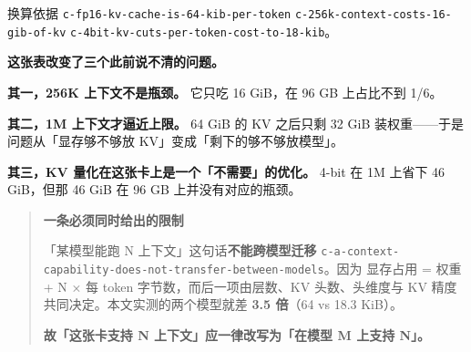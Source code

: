 换算依据 {\scriptsize\texttt{c-\hspace{0pt}fp16-\hspace{0pt}kv-\hspace{0pt}cache-\hspace{0pt}is-\hspace{0pt}64-\hspace{0pt}kib-\hspace{0pt}per-\hspace{0pt}token}} {\scriptsize\texttt{c-\hspace{0pt}256k-\hspace{0pt}context-\hspace{0pt}costs-\hspace{0pt}16-\hspace{0pt}gib-\hspace{0pt}of-\hspace{0pt}kv}} {\scriptsize\texttt{c-\hspace{0pt}4bit-\hspace{0pt}kv-\hspace{0pt}cuts-\hspace{0pt}per-\hspace{0pt}token-\hspace{0pt}cost-\hspace{0pt}to-\hspace{0pt}18-\hspace{0pt}kib}}。


\textbf{这张表改变了三个此前说不清的问题。}


\textbf{其一，256K 上下文不是瓶颈。} 它只吃 16 GiB，在 96 GB 上占比不到 1/6。


\textbf{其二，1M 上下文才逼近上限。} 64 GiB 的 KV 之后只剩 32 GiB 装权重——于是问题从「显存够不够放 KV」变成「剩下的够不够放模型」。


\textbf{其三，KV 量化在这张卡上是一个「不需要」的优化。} 4-bit 在 1M 上省下 46 GiB，但那 46 GiB 在 96 GB 上并没有对应的瓶颈。


\begin{quote}\small
\textbf{ 一条必须同时给出的限制}

「某模型能跑 N 上下文」这句话\textbf{不能跨模型迁移} {\scriptsize\texttt{c-\hspace{0pt}a-\hspace{0pt}context-\hspace{0pt}capability-\hspace{0pt}does-\hspace{0pt}not-\hspace{0pt}transfer-\hspace{0pt}between-\hspace{0pt}models}}。因为 显存占用 = 权重 + N × 每 token 字节数，而后一项由层数、KV 头数、头维度与 KV 精度共同决定。本文实测的两个模型就差 \textbf{3.5 倍}（64 vs 18.3 KiB）。

\textbf{故「这张卡支持 N 上下文」应一律改写为「在模型 M 上支持 N」。}

\end{quote}

